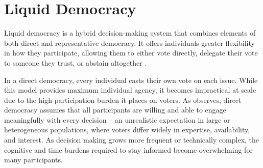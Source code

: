 


\section{Liquid Democracy}
Liquid democracy is a hybrid decision-making system that combines elements of both direct and representative democracy. It offers individuals greater flexibility in how they participate, allowing them to either vote directly, delegate their vote to someone they trust, or abstain altogether \citep{blum_liquid_2016}.

In a direct democracy, every individual casts their own vote on each issue. While this model provides maximum individual agency, it becomes impractical at scale due to the high participation burden it places on voters. As \citet{ford_delegative_2002} observes, direct democracy assumes that all participants are willing and able to engage meaningfully with every decision -- an unrealistic expectation in large or heterogeneous populations, where voters differ widely in expertise, availability, and interest. As decision making grows more frequent or technically complex, the cognitive and time burdens required to stay informed become overwhelming for many participants.

